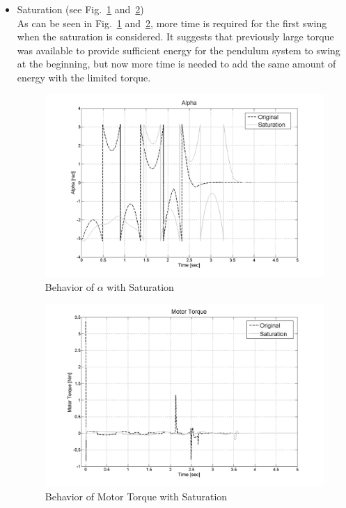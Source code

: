 \documentclass{article}
\theoremstyle{plain}
\theoremstyle{definition}
\theoremstyle{remark}
\begin{document}
\begin{itemize}
\item Saturation (see Fig.~\ref{fig:q10_s1} and~\ref{fig:q10_s2})\\
As can be seen in Fig.~\ref{fig:q10_s1} and~\ref{fig:q10_s2}, more time is required for the first swing when the saturation is considered. It suggests that previously large torque was available to provide sufficient energy for the pendulum system to swing at the beginning, but now more time is needed to add the same amount of energy with the limited torque.      

\begin{figure}[h]
\includegraphics[width=1\textwidth]{q10_s1.png}
\caption{Behavior of $\alpha$ with Saturation} \label{tex}
\label{fig:q10_s1}
\end{figure}
\begin{figure}[h]
\includegraphics[width=1\textwidth]{q10_s2.png}
\caption{Behavior of Motor Torque with Saturation} \label{tex}
\label{fig:q10_s2}
\end{figure}


\end{itemize}
\end{document}
